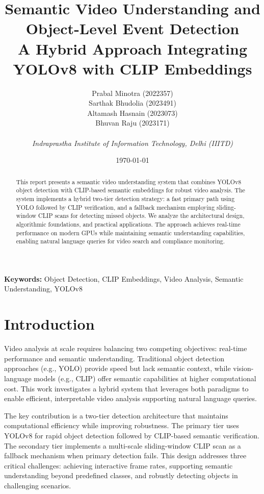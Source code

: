 \documentclass[12pt,a4paper]{article}
\title{\textbf{Semantic Video Understanding and Object-Level Event Detection} \\
\Large{A Hybrid Approach Integrating YOLOv8 with CLIP Embeddings}}
\author{
    Prabal Minotra (2022357) \\
    Sarthak Bhudolia (2023491) \\
    Altamash Hasnain (2023073) \\
    Bhuvan Raju (2023171) \\
    \\
    \textit{Indraprastha Institute of Information Technology, Delhi (IIITD)}
}
\date{\today}
\begin{document}
\maketitle

\begin{abstract}

This report presents a semantic video understanding system that combines YOLOv8 object detection with CLIP-based semantic embeddings for robust video analysis. The system implements a hybrid two-tier detection strategy: a fast primary path using YOLO followed by CLIP verification, and a fallback mechanism employing sliding-window CLIP scans for detecting missed objects. We analyze the architectural design, algorithmic foundations, and practical applications. The approach achieves real-time performance on modern GPUs while maintaining semantic understanding capabilities, enabling natural language queries for video search and compliance monitoring.

\end{abstract}

\textbf{Keywords:} Object Detection, CLIP Embeddings, Video Analysis, Semantic Understanding, YOLOv8

\section{Introduction}

Video analysis at scale requires balancing two competing objectives: real-time performance and semantic understanding. Traditional object detection approaches (e.g., YOLO) provide speed but lack semantic context, while vision-language models (e.g., CLIP) offer semantic capabilities at higher computational cost. This work investigates a hybrid system that leverages both paradigms to enable efficient, interpretable video analysis supporting natural language queries.

The key contribution is a two-tier detection architecture that maintains computational efficiency while improving robustness. The primary tier uses YOLOv8 for rapid object detection followed by CLIP-based semantic verification. The secondary tier implements a multi-scale sliding-window CLIP scan as a fallback mechanism when primary detection fails. This design addresses three critical challenges: achieving interactive frame rates, supporting semantic understanding beyond predefined classes, and robustly detecting objects in challenging scenarios.
\end{document}
